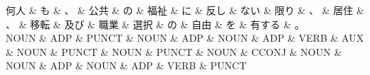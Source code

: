 \documentclass[tikz,border=5pt]{standalone}
\begin{document}
\normalsize
\begin{dependency}[edge unit distance=12.0pt]
    \begin{deptext}[column sep=1em]
        何人 \& も \& 、 \& 公共 \& の \& 福祉 \& に \& 反し \& ない \& 限り \& 、 \& 居住 \& 、 \& 移転 \& 及び \& 職業 \& 選択 \& の \& 自由 \& を \& 有する \& 。\\
        NOUN \& ADP \& PUNCT \& NOUN \& ADP \& NOUN \& ADP \& VERB \& AUX \& NOUN \& PUNCT \& NOUN \& PUNCT \& NOUN \& CCONJ \& NOUN \& NOUN \& ADP \& NOUN \& ADP \& VERB \& PUNCT\\
    \end{deptext}
\end{dependency}
\end{document}
